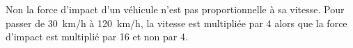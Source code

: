 %
%
    Non la force d'impact d'un véhicule n'est pas proportionnelle à sa vitesse. Pour passer de \SI{30}{km/h} à \SI{120}{km/h}, la vitesse est multipliée par 4 alors que la force d'impact est multiplié par 16 et non par 4.
